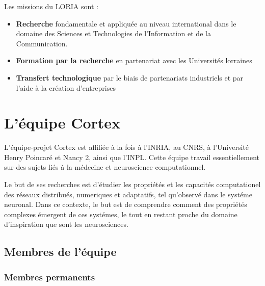 Les missions du LORIA sont :
\begin{itemize}
   \item \textbf{Recherche} fondamentale et appliquée au niveau international dans le domaine des Sciences et
      Technologies de l'Information et de la Communication.
   \item \textbf{Formation par la recherche} en partenariat avec les Universités lorraines
   \item \textbf{Transfert technologique} par le biais de partenariats industriels et par l'aide à la création
      d'entreprises
\end{itemize}


\section{L'équipe Cortex} %
\label{sec:Cortex}

L'équipe-projet Cortex est affiliée à la fois à l'INRIA, au CNRS, à l'Université Henry Poincaré et Nancy 2,
ainsi que l'INPL. Cette équipe travail essentiellement sur des sujets liés à la médecine et neuroscience
computationnel.

Le but de ses recherches est d'étudier les propriétés et les capacités computationel des réseaux distribués,
numeriques et adaptatifs, tel qu'observé dans le systéme neuronal. Dans ce contexte, le but est de
comprendre comment des propriétés complexes émergent de ces systémes, le tout en restant proche du domaine
d'inspiration que sont les neurosciences. 

\subsection{Membres de l'équipe} %
\label{sub:Membres de l'équipe}

\subsubsection{Membres permanents} %
\label{ssub:Membres permanents}

